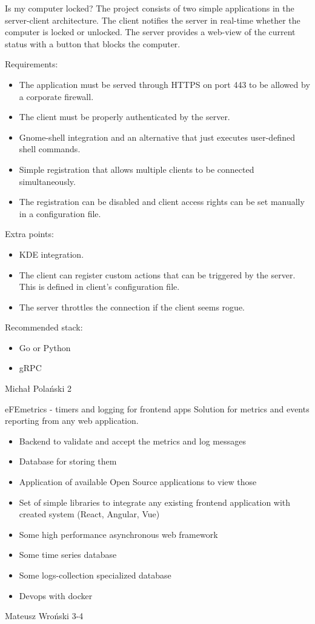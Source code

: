 \begin{project}
{Is my computer locked?}
{The project consists of two simple applications in the server-client architecture. The client notifies the server in real-time whether the computer is locked or unlocked. The server provides a web-view of the current status with a button that blocks the computer.}
{
Requirements:
\begin{itemize}
	\item The application must be served through HTTPS on port 443 to be allowed by a corporate firewall.
	\item The client must be properly authenticated by the server.
	\item Gnome-shell integration and an alternative that just executes user-defined shell commands.
	\item Simple registration that allows multiple clients to be connected simultaneously.
	\item The registration can be disabled and client access rights can be set manually in a configuration file.
\end{itemize}
Extra points:
\begin{itemize}
	\item KDE integration.
	\item The client can register custom actions that can be triggered by the server. This is defined in client's configuration file.
	\item The server throttles the connection if the client seems rogue.
\end{itemize}
}
{
Recommended stack:
\begin{itemize}
	\item Go or Python
	\item gRPC
\end{itemize}
}
{Michał Polański}
{2}
\end{project}
\begin{project}
{eFEmetrics - timers and logging for frontend apps}
{Solution for metrics and events reporting from any web application.}
{
\begin{itemize}
	\item Backend to validate and accept the metrics and log messages
	\item Database for storing them
	\item Application of available Open Source applications to view those
	\item Set of simple libraries to integrate any existing frontend application with created system (React, Angular, Vue)
\end{itemize}
}
{
\begin{itemize}
	\item Some high performance asynchronous web framework
	\item Some time series database
	\item Some logs-collection specialized database
	\item Devops with docker
\end{itemize}
}
{Mateusz Wroński}
{3-4}
\end{project}
